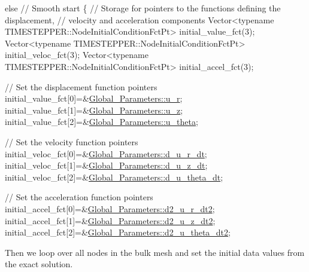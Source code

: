 \begin{DoxyCodeInclude}
 \textcolor{keywordflow}{else} \textcolor{comment}{// Smooth start}
  \{
   \textcolor{comment}{// Storage for pointers to the functions defining the displacement,}
   \textcolor{comment}{// velocity and acceleration components}
   Vector<typename TIMESTEPPER::NodeInitialConditionFctPt>
    initial\_value\_fct(3);
   Vector<typename TIMESTEPPER::NodeInitialConditionFctPt>
    initial\_veloc\_fct(3);
   Vector<typename TIMESTEPPER::NodeInitialConditionFctPt>
    initial\_accel\_fct(3);

   \textcolor{comment}{// Set the displacement function pointers}
   initial\_value\_fct[0]=&\hyperlink{namespaceGlobal__Parameters_ae600c7d1b0928a5cb532fa3a93bab338}{Global\_Parameters::u\_r};
   initial\_value\_fct[1]=&\hyperlink{namespaceGlobal__Parameters_adc24d54054d6868dfb4bf3eedb2b062d}{Global\_Parameters::u\_z};
   initial\_value\_fct[2]=&\hyperlink{namespaceGlobal__Parameters_aed85254e9565e5e25dbe336a799bf6b5}{Global\_Parameters::u\_theta};

   \textcolor{comment}{// Set the velocity function pointers}
   initial\_veloc\_fct[0]=&\hyperlink{namespaceGlobal__Parameters_aa587494218fe51b7d23a58009bf370f6}{Global\_Parameters::d\_u\_r\_dt};
   initial\_veloc\_fct[1]=&\hyperlink{namespaceGlobal__Parameters_adc07c67f4203664ac0c23c4ff9d4dac1}{Global\_Parameters::d\_u\_z\_dt};
   initial\_veloc\_fct[2]=&\hyperlink{namespaceGlobal__Parameters_a87fd49f1b07cd74a364cf1373890864e}{Global\_Parameters::d\_u\_theta\_dt};

   \textcolor{comment}{// Set the acceleration function pointers}
   initial\_accel\_fct[0]=&\hyperlink{namespaceGlobal__Parameters_a37715fdf266bd7d91b44ad779e20a11a}{Global\_Parameters::d2\_u\_r\_dt2};
   initial\_accel\_fct[1]=&\hyperlink{namespaceGlobal__Parameters_a2167fee22e8f4d63a51a39ace1e3a743}{Global\_Parameters::d2\_u\_z\_dt2};
   initial\_accel\_fct[2]=&\hyperlink{namespaceGlobal__Parameters_a902b0bba2b1393518a914330f30ee4c9}{Global\_Parameters::d2\_u\_theta\_dt2};

\end{DoxyCodeInclude}


Then we loop over all nodes in the bulk mesh and set the initial data values from the exact solution.


